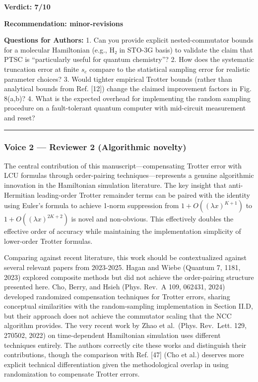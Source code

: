 \documentclass[10pt,letterpaper]{article}
\begin{document}
\textbf{Verdict: 7/10}

\textbf{Recommendation: minor-revisions}

\textbf{Questions for Authors:}
1. Can you provide explicit nested-commutator bounds for a molecular Hamiltonian (e.g., H₂ in STO-3G basis) to validate the claim that PTSC is ``particularly useful for quantum chemistry''?
2. How does the systematic truncation error at finite \(s_c\) compare to the statistical sampling error for realistic parameter choices?
3. Would tighter empirical Trotter bounds (rather than analytical bounds from Ref. {[}12{]}) change the claimed improvement factors in Fig. 8(a,b)?
4. What is the expected overhead for implementing the random sampling procedure on a fault-tolerant quantum computer with mid-circuit measurement and reset?

\begin{center}\rule{0.5\linewidth}{0.5pt}\end{center}

\hypertarget{voice-2-reviewer-2-algorithmic-novelty}{%
\subsubsection{Voice 2 --- Reviewer 2 (Algorithmic novelty)}\label{voice-2-reviewer-2-algorithmic-novelty}}

The central contribution of this manuscript---compensating Trotter error with LCU formulas through order-pairing techniques---represents a genuine algorithmic innovation in the Hamiltonian simulation literature. The key insight that anti-Hermitian leading-order Trotter remainder terms can be paired with the identity using Euler's formula to achieve 1-norm suppression from \(1 + O((\lambda x)^{K+1})\) to \(1 + O((\lambda x)^{2K+2})\) is novel and non-obvious. This effectively doubles the effective order of accuracy while maintaining the implementation simplicity of lower-order Trotter formulas.

Comparing against recent literature, this work should be contextualized against several relevant papers from 2023-2025. Hagan and Wiebe (Quantum 7, 1181, 2023) explored composite methods but did not achieve the order-pairing structure presented here. Cho, Berry, and Hsieh (Phys. Rev.~A 109, 062431, 2024) developed randomized compensation techniques for Trotter errors, sharing conceptual similarities with the random-sampling implementation in Section II.D, but their approach does not achieve the commutator scaling that the NCC algorithm provides. The very recent work by Zhao et al.~(Phys. Rev.~Lett. 129, 270502, 2022) on time-dependent Hamiltonian simulation uses different techniques entirely. The authors correctly cite these works and distinguish their contributions, though the comparison with Ref. {[}47{]} (Cho et al.) deserves more explicit technical differentiation given the methodological overlap in using randomization to compensate Trotter errors.
\end{document}
